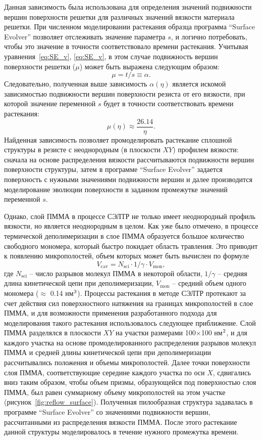 Данная зависимость была использована для определения значений подвижности вершин поверхности решетки для различных значений вязкости материала решетки. При численном моделировании растекания образца программа ``Surface Evolver'' позволяет отслеживать значение параметра $s$, и логично потребовать, чтобы это значение в точности соответствовало времени растекания. Учитывая уравнения~\ref{eq:SE_v}, \ref{eq:SE_v}, в этом случае подвижность вершин поверхности решетки ($\mu$) может быть выражена следующим образом:
\begin{equation}
	\mu = t / s \equiv \alpha.
\end{equation}
Следовательно, полученная выше зависимость $\alpha(\eta)$ является искомой зависимостью подвижности вершин поверхности резиста от его вязкости, при которой значение переменной $s$ будет в точности соответствовать времени растекания:
\begin{equation}
	\mu(\eta) \approx \frac{26.14}{\eta}.
\end{equation}
Найденная зависимость позволяет промоделировать растекание сплошной структуры в резисте с неоднородным (в плоскости $XY$) профилем вязкости: сначала на основе распределения вязкости рассчитываются подвижности вершин поверхности структуры, затем в программе ``Surface Evolver'' задается поверхность с нужными значениями подвижности вершин и далее производится моделирование эволюции поверхности в заданном промежутке значений переменной $s$.

Однако, слой ПММА в процессе СЭЛТР не только имеет неоднородный профиль вязкости, но является неоднородным в целом.
Как уже было отмечено, в процессе термической деполимеризации в слое ПММА образуется большое количество свободного мономера, который быстро покидает область травления.
Это приводит к появлению микрополостей, объем которых может быть вычислен по формуле
\begin{equation}
	V_\mathrm{cav} = N_\mathrm{sci} \cdot 1/\gamma \cdot V_\mathrm{mon},
\end{equation}
где $N_\text{sci}$ -- число разрывов молекул ПММА в некоторой области, $1/\gamma$ -- средняя длина кинетической цепи при деполимеризации, $V_\mathrm{mon}$ -- средний объем одного мономера ($\approx$ 0.14 нм$^\text{3}$).
Процессы растекания в методе СЭЛТР протекают за счет действия сил поверхностного натяжения на границах микрополостей в слое ПММА, и для возможности применения разработанного подхода для моделирования такого растекания использовалось следующее приближение.
Слой ПММА разделялся в плоскости $XY$ на участки размерами 100$\times$100 нм$^\text{2}$, и для каждого участка на основе промоделированного распределения разрывов молекул ПММА и средней длины кинетической цепи при деполимеризации рассчитывались положения и объемы микрополостей.
Далее точки поверхности слоя ПММА, соответствующие середине каждого участка по оси $X$, сдвигались вниз таким образом, чтобы объем призмы, образующейся под поверхностью слоя ПММА, был равен суммарному объему микрополостей на этом участке (рисунок~\ref{fig:reflow_surface}).
Полученная пилообразная структура задавалась в программе ``Surface Evolver'' со значениями подвижности вершин, рассчитанными из распределения вязкости ПММА.
После этого растекание данной структуры моделировалось в течение нужного промежутка времени.

